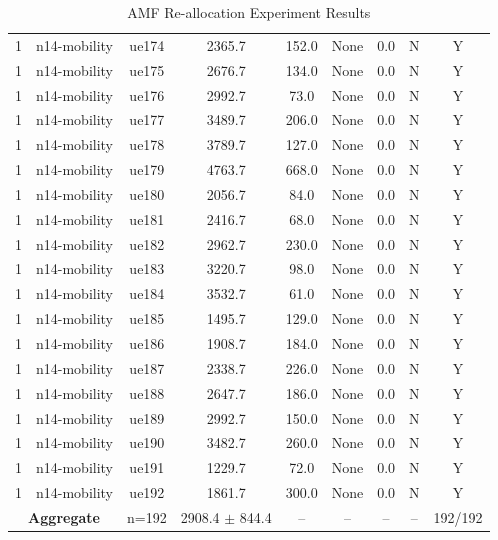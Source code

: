 \begin{table}[ht]
\begin{tabular}{|c|c|c|c|c|c|c|c|c|}
1 & n14-mobility & ue174 & 2365.7 & 152.0 & None & 0.0 & N & Y \\
1 & n14-mobility & ue175 & 2676.7 & 134.0 & None & 0.0 & N & Y \\
1 & n14-mobility & ue176 & 2992.7 & 73.0 & None & 0.0 & N & Y \\
1 & n14-mobility & ue177 & 3489.7 & 206.0 & None & 0.0 & N & Y \\
1 & n14-mobility & ue178 & 3789.7 & 127.0 & None & 0.0 & N & Y \\
1 & n14-mobility & ue179 & 4763.7 & 668.0 & None & 0.0 & N & Y \\
1 & n14-mobility & ue180 & 2056.7 & 84.0 & None & 0.0 & N & Y \\
1 & n14-mobility & ue181 & 2416.7 & 68.0 & None & 0.0 & N & Y \\
1 & n14-mobility & ue182 & 2962.7 & 230.0 & None & 0.0 & N & Y \\
1 & n14-mobility & ue183 & 3220.7 & 98.0 & None & 0.0 & N & Y \\
1 & n14-mobility & ue184 & 3532.7 & 61.0 & None & 0.0 & N & Y \\
1 & n14-mobility & ue185 & 1495.7 & 129.0 & None & 0.0 & N & Y \\
1 & n14-mobility & ue186 & 1908.7 & 184.0 & None & 0.0 & N & Y \\
1 & n14-mobility & ue187 & 2338.7 & 226.0 & None & 0.0 & N & Y \\
1 & n14-mobility & ue188 & 2647.7 & 186.0 & None & 0.0 & N & Y \\
1 & n14-mobility & ue189 & 2992.7 & 150.0 & None & 0.0 & N & Y \\
1 & n14-mobility & ue190 & 3482.7 & 260.0 & None & 0.0 & N & Y \\
1 & n14-mobility & ue191 & 1229.7 & 72.0 & None & 0.0 & N & Y \\
1 & n14-mobility & ue192 & 1861.7 & 300.0 & None & 0.0 & N & Y \\
\multicolumn{2}{|c|}{\textbf{Aggregate}} & n=192 & 2908.4 $\pm$ 844.4 & -- & -- & -- & -- & 192/192 \\
\hline
\end{tabular}
\caption{AMF Re-allocation Experiment Results}
\label{tab:amf_realloc}
\end{table}
